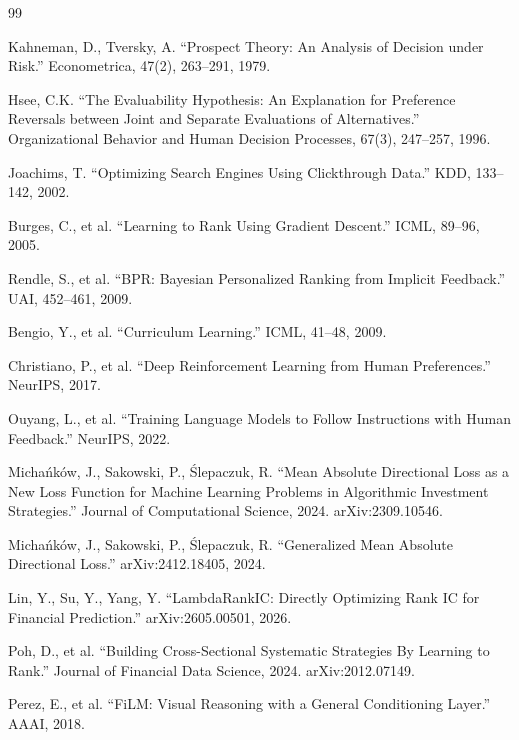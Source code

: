 \documentclass[12pt,a4paper]{ctexart}
\numberwithin{figure}{section}
\numberwithin{table}{section}
\begin{document}
\begin{thebibliography}{99}

Kahneman, D., Tversky, A. ``Prospect Theory: An Analysis of Decision under Risk.'' Econometrica, 47(2), 263--291, 1979.

Hsee, C.K. ``The Evaluability Hypothesis: An Explanation for Preference Reversals between Joint and Separate Evaluations of Alternatives.'' Organizational Behavior and Human Decision Processes, 67(3), 247--257, 1996.

Joachims, T. ``Optimizing Search Engines Using Clickthrough Data.'' KDD, 133--142, 2002.

Burges, C., et al. ``Learning to Rank Using Gradient Descent.'' ICML, 89--96, 2005.

Rendle, S., et al. ``BPR: Bayesian Personalized Ranking from Implicit Feedback.'' UAI, 452--461, 2009.

Bengio, Y., et al. ``Curriculum Learning.'' ICML, 41--48, 2009.

Christiano, P., et al. ``Deep Reinforcement Learning from Human Preferences.'' NeurIPS, 2017.

Ouyang, L., et al. ``Training Language Models to Follow Instructions with Human Feedback.'' NeurIPS, 2022.

Micha\'{n}k\'{o}w, J., Sakowski, P., \'{S}lepaczuk, R. ``Mean Absolute Directional Loss as a New Loss Function for Machine Learning Problems in Algorithmic Investment Strategies.'' Journal of Computational Science, 2024. arXiv:2309.10546.

Micha\'{n}k\'{o}w, J., Sakowski, P., \'{S}lepaczuk, R. ``Generalized Mean Absolute Directional Loss.'' arXiv:2412.18405, 2024.

Lin, Y., Su, Y., Yang, Y. ``LambdaRankIC: Directly Optimizing Rank IC for Financial Prediction.'' arXiv:2605.00501, 2026.

Poh, D., et al. ``Building Cross-Sectional Systematic Strategies By Learning to Rank.'' Journal of Financial Data Science, 2024. arXiv:2012.07149.

Perez, E., et al. ``FiLM: Visual Reasoning with a General Conditioning Layer.'' AAAI, 2018.


\end{thebibliography}
\end{document}
